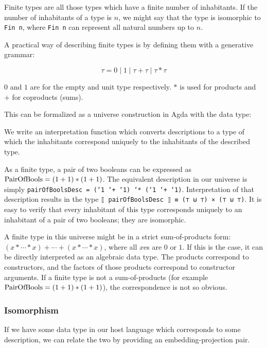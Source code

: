 Finite types are all those types which have a finite number of
inhabitants.
If the number of inhabitants of a type is $n$, we might say that the
type is isomorphic to \texttt{Fin n}, where \texttt{Fin n} can
represent all natural numbers up to $n$.

A practical way of describing finite types is by defining them with a
generative grammar\cite{altenkirch06}:

\[
  τ = 0 \mid 1 \mid τ + τ \mid τ * τ
\]

$0$ and $1$ are for the empty and unit type respectively.
$*$ is used for products and $+$ for coproducts (sums).

This can be formalized as a universe construction\cite{martinloef84}
in Agda with the  data type:


We write an interpretation function which converts descriptions to a
type of which the inhabitants correspond uniquely to the inhabitants
of the described type.


\begin{example}
As a finite type, a pair of two booleans can be expressed as
$\textrm{PairOfBools} = (1 + 1) * (1 + 1)$.
The equivalent description in our universe is simply
\texttt{pairOfBoolsDesc = (`1 `+ `1) `* (`1 `+ `1)}.
Interpretation of that description results in the type
\texttt{⟦ pairOfBoolsDesc ⟧ ≡ (⊤ ⊎ ⊤) × (⊤ ⊎ ⊤)}.
It is easy to verify that every inhabitant of this type corresponds
uniquely to an inhabitant of a pair of two booleans; they are
isomorphic.
\end{example}

A finite type in this universe might be in a strict sum-of-products
form: $(x * ⋯ * x) + ⋯ + (x * ⋯ * x)$, where all $x$es are $0$ or
$1$.
If this is the case, it can be directly interpreted as an algebraic
data type.
The products correspond to constructors, and the factors of those
products correspond to constructor arguments.
If a finite type is not a sum-of-products (for example $\textrm{PairOfBools} =
(1 + 1) * (1 + 1)$), the correspondence is not so obvious.

\subsubsection{Isomorphism}

If we have some data type in our host language which corresponds to
some description, we can relate the two by providing an
embedding-projection pair.

